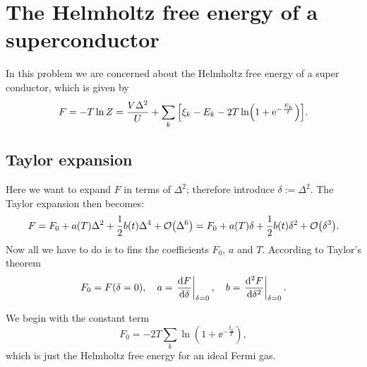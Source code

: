 \documentclass[11pt,letter, swedish, english
]{article}
\begin{document}
\section{The Helmholtz free energy of a superconductor}
\newcommand{\xD}{x_{\text{D}}}
In this problem we are concerned about the Helmholtz free energy of a
super conductor, which is given by
\begin{equation}\label{eq:2_F}
F=-T\ln{Z}=\frac{V\Delta^2}{U} + 
\sum_k\qty[\xi_k-E_k-2T\ln(1+\mathrm{e}^{-\frac{E_k}{T}})].
\end{equation}

\subsection{Taylor expansion}
Here we want to expand $F$ in terms of $\Delta^2$; therefore introduce
$\delta:=\Delta^2$. The Taylor expansion then becomes:
\begin{equation}\label{eq:2a_Taylor_F}
F=F_0+a(T)\Delta^2 + \frac{1}{2}b(t)\Delta^4+\order{\Delta^6}
=F_0+a(T)\delta + \frac{1}{2}b(t)\delta^2+\order{\delta^3}.
\end{equation}
Now all we have to do is to fins the coefficients $F_0$, $a$ and $T$. 
According to Taylor's theorem 
\begin{equation}\label{eq2a:coeff}
F_0=F(\delta=0)\qcomma
a=\eval{\dv{F}{\delta}}_{\delta=0}\qcomma
b=\eval{\dv[2]{F}{\delta}}_{\delta=0}.
\end{equation}

We begin with the constant term
\begin{equation}
F_0=-2T\sum_k\ln(1+\ee^{-\frac{\xi_k}{T}}),
\end{equation}
which is just the Helmholtz free energy for an ideal Fermi gas.
\end{document}
